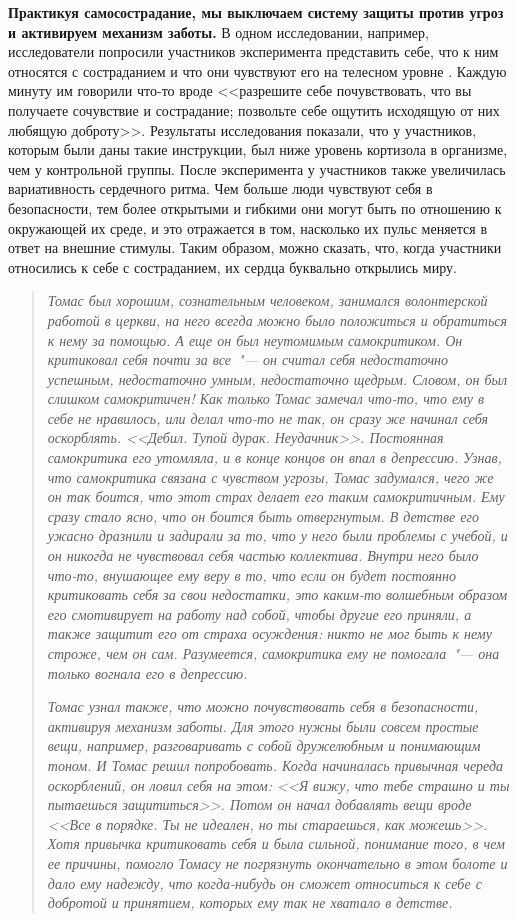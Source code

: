 \textbf{Практикуя самосострадание, мы выключаем систему защиты против угроз и активируем механизм заботы.} В одном исследовании, например, исследователи попросили участников эксперимента представить себе, что к ним относятся с состраданием и что они чувствуют его на телесном уровне \cite{54}. Каждую минуту им говорили что-то вроде <<разрешите себе почувствовать, что вы получаете сочувствие и сострадание; позвольте себе ощутить исходящую от них любящую доброту>>. Результаты исследования показали, что у участников, которым были даны такие инструкции, был ниже уровень кортизола в организме, чем у контрольной группы. После эксперимента у участников также увеличилась вариативность сердечного ритма. Чем больше люди чувствуют себя в безопасности, тем более открытыми и гибкими они могут быть по отношению к окружающей их среде, и это отражается в том, насколько их пульс меняется в ответ на внешние стимулы. Таким образом, можно сказать, что, когда участники относились к себе с состраданием, их сердца буквально открылись миру.

\vspace{4ex}

\begin{quotation}
	\textit{
		Томас был хорошим, сознательным человеком, занимался волонтерской работой в церкви, на него всегда можно было положиться и обратиться к нему за помощью. А еще он был неутомимым самокритиком. Он критиковал себя почти за все~"--- он считал себя недостаточно успешным, недостаточно умным, недостаточно щедрым. Словом, он был слишком самокритичен! Как только Томас замечал что-то, что ему в себе не нравилось, или делал что-то не так, он сразу же начинал себя оскорблять. <<Дебил. Тупой дурак. Неудачник>>. Постоянная самокритика его утомляла, и в конце концов он впал в депрессию. Узнав, что самокритика связана с чувством угрозы, Томас задумался, чего же он так боится, что этот страх делает его таким самокритичным. Ему сразу стало ясно, что он боится быть отвергнутым. В детстве его ужасно дразнили и задирали за то, что у него были проблемы с учебой, и он никогда не чувствовал себя частью коллектива. Внутри него было что-то, внушающее ему веру в то, что если он будет постоянно критиковать себя за свои недостатки, это каким-то волшебным образом его смотивирует на работу над собой, чтобы другие его приняли, а также защитит его от страха осуждения: никто не мог быть к нему строже, чем он сам. Разумеется, самокритика ему не помогала~"--- она только вогнала его в депрессию.
	}
	
	\textit{
		Томас узнал также, что можно почувствовать себя в безопасности, активируя механизм заботы. Для этого нужны были совсем простые вещи, например, разговаривать с собой дружелюбным и понимающим тоном. И Томас решил попробовать. Когда начиналась привычная череда оскорблений, он ловил себя на этом: <<Я вижу, что тебе страшно и ты пытаешься защититься>>. Потом он начал добавлять вещи вроде <<Все в порядке. Ты не идеален, но ты стараешься, как можешь>>. Хотя привычка критиковать себя и была сильной, понимание того, в чем ее причины, помогло Томасу не погрязнуть окончательно в этом болоте и дало ему надежду, что когда-нибудь он сможет относиться к себе с добротой и принятием, которых ему так не хватало в детстве.
	}
\end{quotation}

